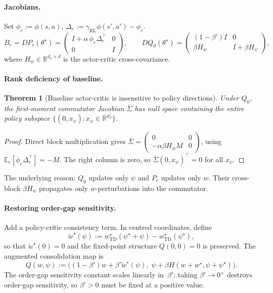 \documentclass[12pt,a4paper]{article}
\newtheorem{theorem}[definition]{Theorem}
\newcommand{\R}{\mathbb{R}}
\begin{document}
\paragraph{Jacobians.}
Set $\phi_e := \phi(s, a)$, $\Delta_e := \gamma_{\mathrm{RL}}\phi(s', a') - \phi_e$.
\[
  B_e = DP_e(\theta^\star) =
  \begin{pmatrix} I + \alpha\,\phi_e \Delta_e^\top & 0 \\ 0 & I \end{pmatrix},
  \qquad
  DQ_0(\theta^\star) =
  \begin{pmatrix} (1 - \beta')I & 0 \\ \beta H_w & I + \beta H_\psi \end{pmatrix},
\]
where $H_w \in \R^{d_\pi \times d}$ is the actor-critic cross-covariance.

\paragraph{Rank deficiency of baseline.}

\begin{theorem}[Baseline actor-critic is insensitive to policy directions]
\label{prop:rl_rank_deficient}
Under $Q_0$, the first-moment commutator Jacobian $\bar\Sigma$ has null space
containing the entire policy subspace $\{(0, x_\psi) : x_\psi \in \R^{d_\pi}\}$.
\end{theorem}

\begin{proof}
Direct block multiplication gives
$\bar\Sigma = \begin{pmatrix} 0 & 0 \\ -\alpha\beta H_w M & 0 \end{pmatrix}$,
using $\mathbb{E}_e[\phi_e\Delta_e^\top] = -M$.
The right column is zero, so $\bar\Sigma(0, x_\psi)^\top = 0$ for all $x_\psi$.
\end{proof}

The underlying reason: $Q_0$ updates only $\psi$ and $P_e$ updates only $w$.
Their cross-block $\beta H_w$ propagates only $w$-perturbations into the
commutator.

\paragraph{Restoring order-gap sensitivity.}
Add a policy-critic consistency term. In centred coordinates, define
\[
  \widetilde{w}^\star(\psi)
  := w^\star_{\mathrm{TD}}(\psi^\star + \psi) - w^\star_{\mathrm{TD}}(\psi^\star),
\]
so that $\widetilde{w}^\star(0) = 0$ and the fixed-point structure
$Q(0,0) = 0$ is preserved. The augmented consolidation map is
\[
  Q(w, \psi)
  := \bigl((1-\beta')w + \beta'\widetilde{w}^\star(\psi),\;
            \psi + \beta H(w + w^\star, \psi + \psi^\star)\bigr).
\]
The order-gap sensitivity constant scales linearly in~$\beta'$; taking
$\beta' \to 0^+$ destroys order-gap sensitivity, so $\beta' > 0$ must be fixed
at a positive value.
\end{document}
